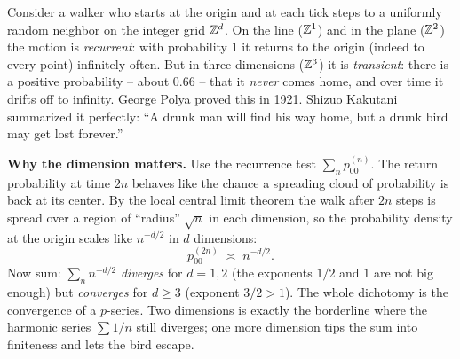 \begin{paradoxbox}
Consider a walker who starts at the origin and at each tick steps to a uniformly random
neighbor on the integer grid $\mathbb{Z}^d$. On the line ($\mathbb{Z}^1$) and in the plane ($\mathbb{Z}^2$) the
motion is \emph{recurrent}: with probability $1$ it returns to the origin (indeed to every point)
infinitely often. But in three dimensions ($\mathbb{Z}^3$) it is \emph{transient}: there is a positive
probability -- about $0.66$ -- that it \emph{never} comes home, and over time it drifts off to
infinity. George Polya proved this in 1921. Shizuo Kakutani summarized it perfectly: ``A drunk
man will find his way home, but a drunk bird may get lost forever.''

\textbf{Why the dimension matters.} Use the recurrence test
$\sum_n p_{00}^{(n)}$. The return probability at time $2n$ behaves like the chance a
spreading cloud of probability is back at its center. By the local central limit theorem the
walk after $2n$ steps is spread over a region of ``radius'' $\sqrt{n}$ in each dimension, so the
probability density at the origin scales like $n^{-d/2}$ in $d$ dimensions:
\[
  p_{00}^{(2n)} \;\asymp\; n^{-d/2}.
\]
Now sum: $\sum_n n^{-d/2}$ \emph{diverges} for $d = 1, 2$ (the exponents $1/2$ and $1$ are not
big enough) but \emph{converges} for $d \ge 3$ (exponent $3/2 > 1$). The whole dichotomy is the
convergence of a $p$-series. Two dimensions is exactly the borderline where the harmonic series
$\sum 1/n$ still diverges; one more dimension tips the sum into finiteness and lets the bird
escape.
\end{paradoxbox}

